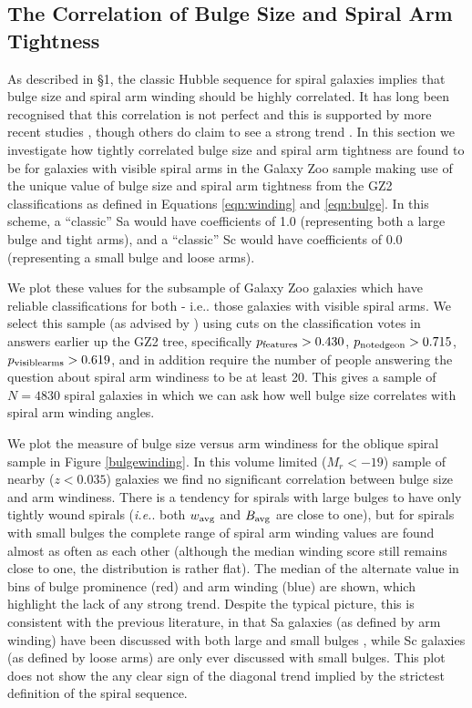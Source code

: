 \documentclass[usenatbib]{mn2e}
\newcommand{\ie}{{\it i.e.}}
\begin{document}
\subsection{The Correlation of Bulge Size and Spiral Arm Tightness}

As described in \S 1, the classic Hubble sequence for spiral galaxies implies that bulge size and spiral arm winding should be highly correlated. It has long been recognised that this correlation is not perfect \citep[e.g.][]{1970ApJ...160..811F, kennicutt1981} and this is supported by more recent studies \citep{Hart2017b,Hart2018}, though others do claim to see a strong trend \citep{Davis2015}. In this section we investigate how tightly correlated bulge size and spiral arm tightness are found to be for galaxies with visible spiral arms in the Galaxy Zoo sample making use of the unique value of bulge size and spiral arm tightness from the GZ2 classifications as defined in Equations \ref{eqn:winding} and \ref{eqn:bulge}. In this scheme, a ``classic'' Sa would have coefficients of 1.0 (representing both a large bulge and tight arms), and a ``classic'' Sc would have coefficients of 0.0 (representing a small bulge and loose arms). 

We plot these values for the subsample of Galaxy Zoo galaxies which have reliable classifications for both - i.e.. those galaxies with visible spiral arms. We select this sample (as advised by \citealt{Willett2013}) using cuts on the classification votes in answers earlier up the GZ2 tree, specifically $p_{\rm features} > 0.430$, $p_{\rm notedgeon} > 0.715$, $p_{\rm visiblearms} > 0.619$, and in addition require the number of people answering the question about spiral arm windiness to be at least 20. This gives a sample of $N = 4830$ spiral galaxies in which we can ask how well bulge size correlates with spiral arm winding angles.
 
 We plot the measure of bulge size versus arm windiness for the oblique spiral sample in Figure \ref{bulgewinding}. In this volume limited ($M_r<-19$) sample of nearby ($z<0.035$) galaxies we find no significant correlation between bulge size and arm windiness. There is a tendency for spirals with large bulges to have only tightly wound spirals (\ie. both $w_{\rm avg}$ and $B_{\rm avg}$ are close to one), but for spirals with small bulges the complete range of spiral arm winding values are found almost as often as each other (although the median winding score still remains close to one, the distribution is rather flat). The median of the alternate value in bins of bulge prominence (red) and arm winding (blue) are shown, which highlight the lack of any strong trend. Despite the typical picture, this is consistent with the previous literature, in that Sa galaxies (as defined by arm winding) have been discussed with both large and small bulges \citep[e.g.][]{Hogg1993}, while Sc galaxies (as defined by loose arms) are only ever discussed with small bulges. This plot does not show the any clear sign of the diagonal trend implied by the strictest definition of the spiral sequence. 
\end{document}
